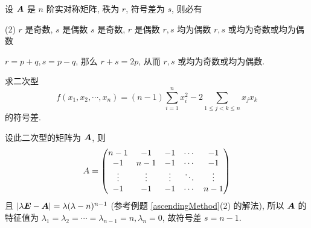 \begin{example}
    设 $\vb*{A}$ 是 $n$ 阶实对称矩阵, 秩为 $r$, 符号差为 $s$, 则必有
    \begin{tasks}(2)
        \task $r$ 是奇数, $s$ 是偶数
        \task $s$ 是奇数, $r$ 是偶数
        \task $r,s$ 均为偶数
        \task $r,s$ 或均为奇数或均为偶数
    \end{tasks}
\end{example}
\begin{solution}
    $r=p+q,s=p-q$, 那么 $r+s=2p$, 从而 $r,s$ 或均为奇数或均为偶数.
\end{solution}

\begin{example}
    求二次型 $$\displaystyle f(x_1,x_2,\cdots,x_n)=(n-1)\sum_{i=1}^{n}x_i^2-2\sum_{1\leqslant j<k\leqslant n}x_jx_k$$
    的符号差.
\end{example}
\begin{solution}
    设此二次型的矩阵为 $\vb*{A}$, 则 $$A=\mqty(n-1&-1&-1&\cdots&-1\\-1&n-1&-1&\cdots&-1\\\vdots& \vdots& \vdots& \ddots & \vdots\\-1&-1&-1&\cdots&n-1)$$
    且 $|\lambda\vb*{E}-\vb*{A}|=\lambda(\lambda-n)^{n-1}$ (参考例题 \ref{ascendingMethod}(2) 的解法), 所以 $\vb*{A}$ 的特征值为 $\lambda_1=\lambda_2=\cdots=\lambda_{n-1}=n,\lambda_n=0$, 故符号差 $s=n-1.$
\end{solution}


